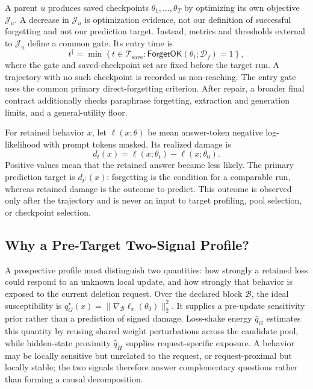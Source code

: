 A parent $u$ produces saved checkpoints $\theta_1,\ldots,\theta_T$ by
optimizing its own objective $\mathcal J_u$. A decrease in $\mathcal J_u$ is
optimization evidence, not our definition of successful forgetting and not
our prediction target. Instead, metrics and thresholds external to
$\mathcal J_u$ define a common gate. Its entry time is
\begin{equation}
    t^\dagger
    =\min\left\{t\in\mathcal T_{\mathrm{save}}:
      \mathsf{ForgetOK}(\theta_t;\mathcal D_f)=1\right\},
    \label{eq:forgetting-gate}
\end{equation}
where the gate and saved-checkpoint set are fixed before the target run. A
trajectory with no such checkpoint is recorded as non-reaching.
The entry gate uses the common primary direct-forgetting criterion. After
repair, a broader final contract additionally checks paraphrase forgetting,
extraction and generation limits, and a general-utility floor.

For retained behavior $x$, let $\ell(x;\theta)$ be mean answer-token negative
log-likelihood with prompt tokens masked. Its realized damage is
\begin{equation}
    d_t(x)=\ell(x;\theta_t)-\ell(x;\theta_0).
    \label{eq:realized-damage}
\end{equation}
Positive values mean that the retained answer became less likely. The primary
prediction target is $d_{t^\dagger}(x)$: forgetting is the condition for a
comparable run, whereas retained damage is the outcome to predict. This
outcome is observed only after the trajectory and is never an input to target
profiling, pool selection, or checkpoint selection.

\subsection{Why a Pre-Target Two-Signal Profile?}

A prospective profile must distinguish two quantities: how strongly a
retained loss could respond to an unknown local update, and how strongly that
behavior is exposed to the current deletion request. Over the declared block
$\mathcal B$, the ideal susceptibility is
$q_G^\star(x)=\|\nabla_{\mathcal B}\ell_x(\theta_0)\|_2^2$. It supplies a
pre-update sensitivity prior rather than a prediction of signed damage.
Loss-shake energy $\widehat q_G$ estimates this quantity by reusing shared
weight perturbations across the candidate pool, while hidden-state proximity
$\widehat q_H$ supplies request-specific exposure. A behavior may be locally
sensitive but unrelated to the request, or request-proximal but locally
stable; the two signals therefore answer complementary questions rather than
forming a causal decomposition.

